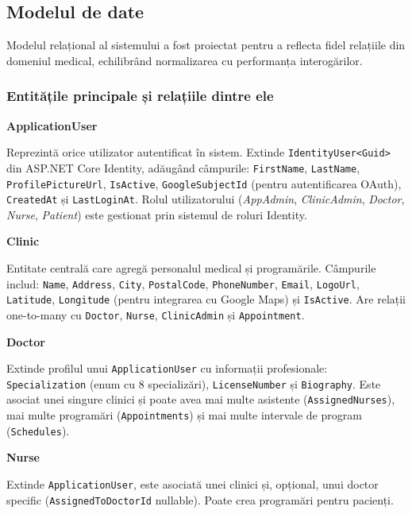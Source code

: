 \documentclass[12pt, a4paper]{report}
\begin{document}

\subsection{Modelul de date}

Modelul relațional al sistemului a fost proiectat pentru a reflecta fidel relațiile din
domeniul medical, echilibrând normalizarea cu performanța interogărilor.

\subsubsection{Entitățile principale și relațiile dintre ele}

\textbf{ApplicationUser}

Reprezintă orice utilizator autentificat în sistem. Extinde \texttt{IdentityUser<Guid>}
din ASP.NET Core Identity, adăugând câmpurile: \texttt{FirstName}, \texttt{LastName},
\texttt{ProfilePictureUrl}, \texttt{IsActive}, \texttt{GoogleSubjectId} (pentru
autentificarea OAuth), \texttt{CreatedAt} și \texttt{LastLoginAt}. Rolul utilizatorului
(\textit{AppAdmin}, \textit{ClinicAdmin}, \textit{Doctor}, \textit{Nurse},
\textit{Patient}) este gestionat prin sistemul de roluri Identity.

\textbf{Clinic}

Entitate centrală care agregă personalul medical și programările. Câmpurile includ:
\texttt{Name}, \texttt{Address}, \texttt{City}, \texttt{PostalCode}, \texttt{PhoneNumber},
\texttt{Email}, \texttt{LogoUrl}, \texttt{Latitude}, \texttt{Longitude} (pentru
integrarea cu Google Maps) și \texttt{IsActive}. Are relații one-to-many cu
\texttt{Doctor}, \texttt{Nurse}, \texttt{ClinicAdmin} și \texttt{Appointment}.

\textbf{Doctor}

Extinde profilul unui \texttt{ApplicationUser} cu informații profesionale:
\texttt{Specialization} (enum cu 8 specializări), \texttt{LicenseNumber} și
\texttt{Biography}. Este asociat unei singure clinici și poate avea mai multe asistente
(\texttt{AssignedNurses}), mai multe programări (\texttt{Appointments}) și mai multe
intervale de program (\texttt{Schedules}).

\textbf{Nurse}

Extinde \texttt{ApplicationUser}, este asociată unei clinici și, opțional, unui doctor
specific (\texttt{AssignedToDoctorId} nullable). Poate crea programări pentru pacienți.
\end{document}
